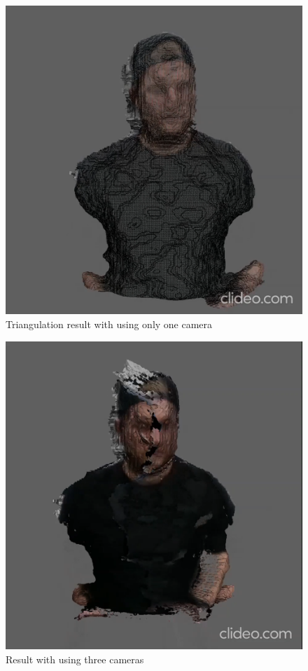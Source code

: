 \documentclass[10pt,twocolumn,letterpaper]{article}
\begin{document}
\begin{figure}[t]
\begin{center}
\includegraphics[width=0.65\linewidth]{imgs/res2}
\end{center}
 \caption{Triangulation result with using only one camera}
 \label{fig:res2}
\end{figure}

\begin{figure}[t]
\begin{center}
\includegraphics[width=0.65\linewidth]{imgs/res3}
\end{center}
 \caption{Result with using three cameras}
 \label{fig:res3}
\end{figure}
\end{document}
